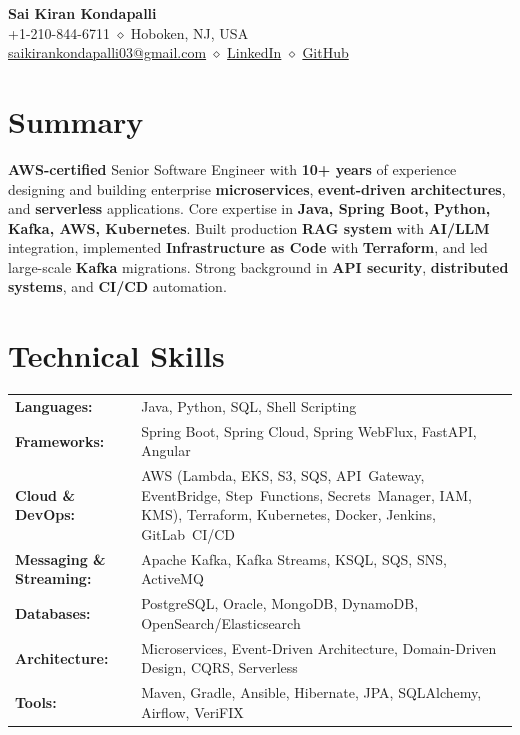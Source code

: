 \documentclass[11pt,a4paper]{article}
\newcommand{\resumeHeader}[4]{
    \begin{center}
        {\Huge\bfseries #1}\\[0.3cm]
        #2 \quad $\diamond$ \quad #3\\[0.15cm]
        #4
    \end{center}
}
\begin{document}

\resumeHeader{Sai Kiran Kondapalli}
{+1-210-844-6711}
{Hoboken, NJ, USA}
{\href{mailto:saikirankondapalli03@gmail.com}{saikirankondapalli03@gmail.com} \quad $\diamond$ \quad \href{https://www.linkedin.com/in/saikirankondapalli}{LinkedIn} \quad $\diamond$ \quad \href{https://github.com/saikirankondapalli}{GitHub}}

\section{Summary}
\small\raggedright{\textbf{AWS-certified} Senior Software Engineer with \textbf{10+ years} of experience designing and building enterprise \textbf{microservices}, \textbf{event-driven architectures}, and \textbf{serverless} applications. Core expertise in \textbf{Java, Spring Boot, Python, Kafka, AWS, Kubernetes}. Built production \textbf{RAG system} with \textbf{AI/LLM} integration, implemented \textbf{Infrastructure as Code} with \textbf{Terraform}, and led large-scale \textbf{Kafka} migrations. Strong background in \textbf{API security}, \textbf{distributed systems}, and \textbf{CI/CD} automation.}

\section{Technical Skills}
\renewcommand{\arraystretch}{1.1}
\begin{tabularx}{\textwidth}{@{}lX@{}}
    \textbf{Languages:} & Java, Python, SQL, Shell Scripting\\
    \textbf{Frameworks:} & Spring Boot, Spring Cloud, Spring WebFlux, FastAPI, Angular\\
    \textbf{Cloud \& DevOps:} & AWS (Lambda, EKS, S3, SQS, API~Gateway, EventBridge, Step~Functions, Secrets~Manager, IAM, KMS), Terraform, Kubernetes, Docker, Jenkins, GitLab~CI/CD\\
    \textbf{Messaging \& Streaming:} & Apache Kafka, Kafka Streams, KSQL, SQS, SNS, ActiveMQ\\
    \textbf{Databases:} & PostgreSQL, Oracle, MongoDB, DynamoDB, OpenSearch/Elasticsearch\\
    \textbf{Architecture:} & Microservices, Event-Driven Architecture, Domain-Driven Design, CQRS, Serverless\\
    \textbf{Tools:} & Maven, Gradle, Ansible, Hibernate, JPA, SQLAlchemy, Airflow, VeriFIX\\
\end{tabularx}
\renewcommand{\arraystretch}{1}
\end{document}
